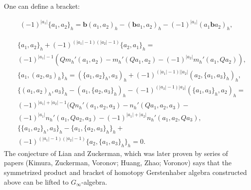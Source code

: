 \documentclass[9pt]{beamer}
\begin{document}
\begin{frame}[t]
One can define a bracket:

\begin{eqnarray*}\label{brack}
(-1)^{|a_1|}\{a_1,a_2\}_h=\mathbf{b}(a_1,a_2)_h-(\mathbf{b}a_1,a_2)_h-(-1)^{|a_1|}(a_1\mathbf{b}a_2)_h,
\end{eqnarray*}

\begin{eqnarray*}
&&\{a_1,a_2\}_h+(-1)^{(|a_1|-1)(|a_2|-1)}\{a_2,a_1\}_h=\nonumber\\
&&(-1)^{|a_1|-1}(Qm_h'(a_1,a_2)-m_h'(Qa_1,a_2)-(-1)^{|a_2|}m_h'(a_1,Qa_2)),
\nonumber\\
&& \{a_1,(a_2,a_3)_h\}_h=(\{a_1,a_2\}_h,a_3)_h+(-1)^{(|a_1|-1)||a_2|}(a_2,\{a_1, a_3\}_h)_h,\nonumber\\
&&\{(a_1,a_2)_h,a_3\}_h-(a_1,\{a_2,a_3\}_h)_h-(-1)^{(|a_3|-1)|a_2|}(\{a_1,a_3\}_h,a_2)_h=\nonumber\\
&&(-1)^{|a_1|+|a_2|-1}(Qn_h'(a_1,a_2,a_3)-n_h'(Qa_1,a_2,a_3)-\nonumber\\
&&(-1)^{|a_1|}n_h'(a_1,Qa_2,a_3)-(-1)^{|a_1|+|a_2|}n_h'(a_1,a_2,Qa_3),\nonumber\\
&&\{\{a_1,a_2\}_h,a_3\}_h-\{a_1,\{a_2,a_3\}_h\}_h+\nonumber\\
&&(-1)^{(|a_1|-1)(|a_2|-1)}\{a_2,\{a_1,a_3\}_h\}_h=0.\nonumber
\end{eqnarray*}
The conjecture of Lian and Zuckerman, which was later proven by series of papers (Kimura, Zuckerman, Voronov; Huang, Zhao; Voronov) says that the symmetrized product and bracket of homotopy Gerstenhaber algebra constructed above can be lifted to $G_{\infty}$-algebra.


\end{frame}
\end{document}
